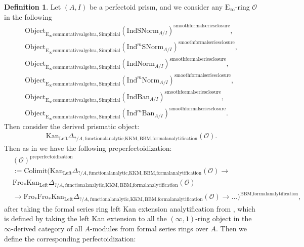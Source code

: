 \documentclass[11pt]{book}
\theoremstyle{definition}
\newtheorem{definition}[theorem]{Definition}
\numberwithin{equation}{section}
\begin{document}
\begin{definition}
Let $(A,I)$ be a perfectoid prism, and we consider any $\mathrm{E}_\infty$-ring $\mathcal{O}$ in the following
\begin{align}
\mathrm{Object}_{\mathrm{E}_\infty\mathrm{commutativealgebra},\mathrm{Simplicial}}(\mathrm{IndSNorm}_{A/I})^{\mathrm{smoothformalseriesclosure}},\\
\mathrm{Object}_{\mathrm{E}_\infty\mathrm{commutativealgebra},\mathrm{Simplicial}}(\mathrm{Ind}^m\mathrm{SNorm}_{A/I})^{\mathrm{smoothformalseriesclosure}},\\
\mathrm{Object}_{\mathrm{E}_\infty\mathrm{commutativealgebra},\mathrm{Simplicial}}(\mathrm{IndNorm}_{A/I})^{\mathrm{smoothformalseriesclosure}},\\
\mathrm{Object}_{\mathrm{E}_\infty\mathrm{commutativealgebra},\mathrm{Simplicial}}(\mathrm{Ind}^m\mathrm{Norm}_{A/I})^{\mathrm{smoothformalseriesclosure}},\\
\mathrm{Object}_{\mathrm{E}_\infty\mathrm{commutativealgebra},\mathrm{Simplicial}}(\mathrm{IndBan}_{A/I})^{\mathrm{smoothformalseriesclosure}},\\
\mathrm{Object}_{\mathrm{E}_\infty\mathrm{commutativealgebra},\mathrm{Simplicial}}(\mathrm{Ind}^m\mathrm{Ban}_{A/I})^{\mathrm{smoothformalseriesclosure}}.
\end{align}
Then consider the derived prismatic object:
\begin{align}
\mathrm{Kan}_{\mathrm{Left}}\Delta_{?/A,\text{functionalanalytic,KKM},\text{BBM,formalanalytification}}(\mathcal{O}).
\end{align}	
Then as in \cite[Definition 8.2]{12BS} we have the following preperfectoidization:
\begin{align}
&(\mathcal{O})^{\text{preperfectoidization}}\\
&:=\mathrm{Colimit}(\mathrm{Kan}_{\mathrm{Left}}\Delta_{?/A,\text{functionalanalytic,KKM},\text{BBM,formalanalytification}}(\mathcal{O})\rightarrow \\
&\mathrm{Fro}_*\mathrm{Kan}_{\mathrm{Left}}\Delta_{?/A,\text{functionalanalytic,KKM},\text{BBM,formalanalytification}}(\mathcal{O})\\
&\rightarrow \mathrm{Fro}_* \mathrm{Fro}_*\mathrm{Kan}_{\mathrm{Left}}\Delta_{?/A,\text{functionalanalytic,KKM},\text{BBM,formalanalytification}}(\mathcal{O})\rightarrow...)^{\text{BBM,formalanalytification}},	
\end{align}
after taking the formal series ring left Kan extension analytification from \cite[Section 4.2]{BBM}, which is defined by taking the left Kan extension to all the $(\infty,1)$-ring object in the $\infty$-derived category of all $A$-modules from formal series rings over $A$. Then we define the corresponding perfectoidization:

\end{definition}
\end{document}
